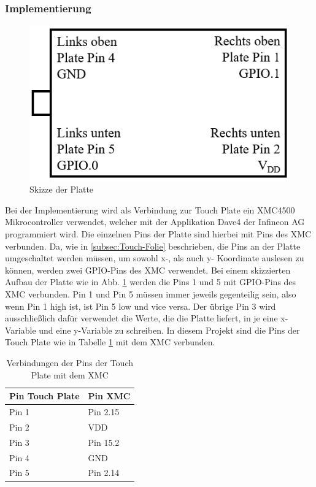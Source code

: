 \documentclass[12pt,a4paper,bibliography=totoc,listof=totoc]{scrartcl}
\begin{document}
\subsubsection{Implementierung}

\begin{figure}[htbp]
	\centering
	\includegraphics[scale = 0.6]{pics/PlatteSkizze.png}
	\caption{Skizze der Platte} 
	\label{fig:PlatteSkizze}
\end{figure}

Bei der Implementierung wird als Verbindung zur Touch Plate ein XMC4500 Mikrocontroller verwendet, welcher mit der Applikation Dave4 der Infineon AG programmiert wird.
Die einzelnen Pins der Platte sind hierbei mit Pins des XMC verbunden. Da, wie in \ref{subsec:Touch-Folie} beschrieben, die Pins an der Platte umgeschaltet werden müssen, um sowohl x-, als auch y- Koordinate auslesen zu können, werden zwei GPIO-Pins des XMC verwendet. Bei einem skizzierten Aufbau der Platte wie in Abb. \ref{fig:PlatteSkizze} werden die Pins 1 und 5 mit GPIO-Pins des XMC verbunden. Pin 1 und Pin 5 müssen immer jeweils gegenteilig sein, also wenn Pin 1 high ist, ist Pin 5 low und vice versa.
Der übrige Pin 3 wird ausschließlich dafür verwendet die Werte, die die Platte liefert, in je eine x-Variable und eine y-Variable zu schreiben. 
In diesem Projekt sind die Pins der Touch Plate wie in Tabelle \ref{tab:VerbindungenPins} mit dem XMC verbunden.

\begin{table}[]
\centering
\begin{tabular}{l|l}
Pin Touch Plate & Pin XMC \\
\hline
Pin 1           & Pin 2.15\\
Pin 2           & VDD     \\
Pin 3           & Pin 15.2    \\
Pin 4           & GND     \\
Pin 5           & Pin 2.14
\end{tabular}
\caption{Verbindungen der Pins der Touch Plate mit dem XMC \label{tab:VerbindungenPins}}
\end{table}
\end{document}
